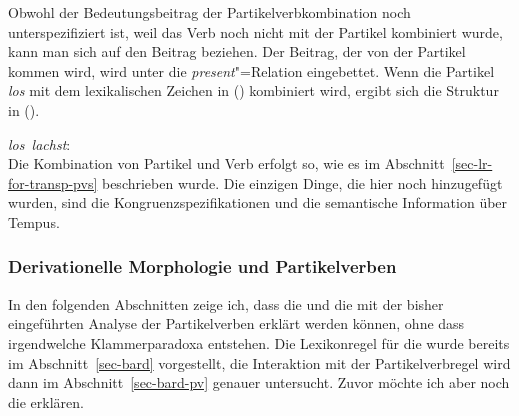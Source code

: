 \noindent
Obwohl der Bedeutungsbeitrag der Partikelverbkombination  noch unterspezifiziert
ist, weil das Verb noch nicht mit der Partikel kombiniert wurde, kann man sich
auf den Beitrag beziehen. Der Beitrag, der von der Partikel kommen wird, wird unter
die \emph{present}"=Relation eingebettet. Wenn die Partikel \emph{los}
mit dem lexikalischen Zeichen in () kombiniert wird, ergibt sich die Struktur in ().

\eas
\mbox{\emph{los lachst}:}\\
\zs
Die Kombination von Partikel und Verb erfolgt so, wie es im Abschnitt~\ref{sec-lr-for-transp-pvs}
beschrieben wurde. Die einzigen Dinge, die hier noch hinzugefügt wurden, sind die
Kongruenzspezifikationen und die semantische Information über Tempus.



\subsubsection{Derivationelle Morphologie und Partikelverben}
\label{sec-derivation-hpsg}

In den folgenden Abschnitten zeige ich, dass die \geen und die \bard
mit der bisher eingeführten Analyse der Partikelverben erklärt werden können,
ohne dass irgendwelche Klammerparadoxa entstehen. Die Lexikonregel für die
\bard wurde bereits im Abschnitt~\ref{sec-bard} vorgestellt, die Interaktion mit der
Partikelverbregel wird dann im Abschnitt~\ref{sec-bard-pv} genauer untersucht.
Zuvor möchte ich aber noch die \geen erklären.


